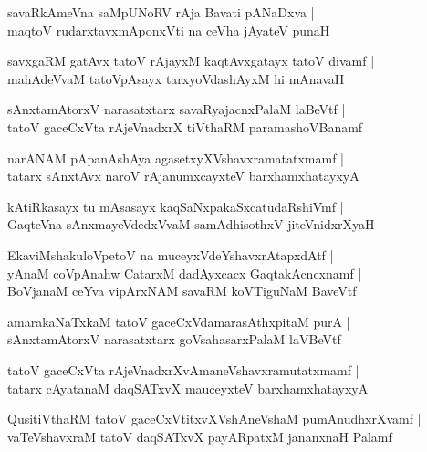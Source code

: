 \documentclass[twoside,12pt,openright]{book}
\newcounter{shloka}[chapter]
\begin{document}
\begin{shloka}
savaRkAmeVna saMpUNoRV rAja Bavati pANaDxva |\\
maqtoV rudarxtavxmAponxVti na ceVha jAyateV punaH 
\end{shloka}


\begin{shloka}
savxgaRM gatAvx tatoV rAjayxM kaqtAvxgatayx tatoV divamf |\\
mahAdeVvaM tatoVpAsayx tarxyoVdashAyxM hi mAnavaH 
\end{shloka}

\begin{shloka}
sAnxtamAtorxV narasatxtarx savaRyajacnxPalaM laBeVtf |\\
tatoV gaceCxVta rAjeVnadxrX tiVthaRM paramashoVBanamf 
\end{shloka}

\begin{shloka}
narANAM pApanAshAya agasetxyXVshavxramatatxmamf |\\
tatarx sAnxtAvx naroV rAjanumxcayxteV barxhamxhatayxyA
\end{shloka}

\begin{shloka}
kAtiRkasayx tu mAsasayx kaqSaNxpakaSxcatudaRshiVmf |\\
GaqteVna sAnxmayeVdedxVvaM samAdhisothxV jiteVnidxrXyaH 
\end{shloka}

\begin{shloka}
EkaviMshakuloVpetoV na muceyxVdeYshavxrAtapxdAtf |\\
yAnaM coVpAnahw CatarxM dadAyxcacx GaqtakAcncxnamf |\\
BoVjanaM ceYva vipArxNAM savaRM koVTiguNaM BaveVtf
\end{shloka}

\begin{shloka}
amarakaNaTxkaM tatoV gaceCxVdamarasAthxpitaM purA |\\
sAnxtamAtorxV narasatxtarx goVsahasarxPalaM laVBeVtf
\end{shloka}

\begin{shloka}
tatoV gaceCxVta rAjeVnadxrXvAmaneVshavxramutatxmamf |\\
tatarx cAyatanaM daqSATxvX mauceyxteV barxhamxhatayxyA  
\end{shloka}

\begin{shloka}
QusitiVthaRM tatoV gaceCxVtitxvXVshAneVshaM pumAnudhxrXvamf |\\
vaTeVshavxraM tatoV daqSATxvX payARpatxM jananxnaH Palamf 
\end{shloka}
\end{document}
